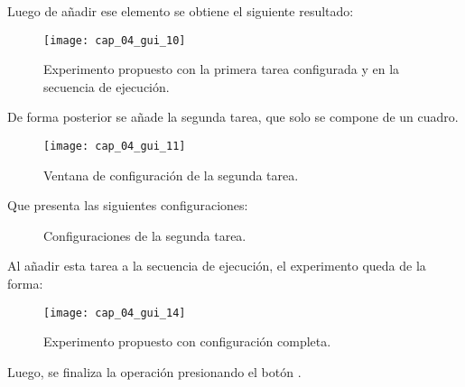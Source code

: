\documentclass[\main/main.tex]{subfiles}
\begin{document}
                \newpage
                \vspace{-6mm}
                Luego de añadir ese elemento se obtiene el siguiente resultado:
                \begin{figure}[H]
                    \centering
                    \texttt{[image: cap\_04\_gui\_10]}
                    \caption{Experimento propuesto con la primera tarea configurada y en la secuencia de ejecución.}
                    \label{fig:04_gui_exp07}
                \end{figure} 

                \vspace{-6mm}
                De forma posterior se añade la segunda tarea, que solo se compone de un cuadro.
                \begin{figure}[H]
                    \centering
                    \texttt{[image: cap\_04\_gui\_11]}
                    \caption{Ventana de configuración de la segunda tarea.}
                    \label{fig:04_gui_exp08}
                \end{figure} 

                \newpage
                \vspace{-6mm}
                Que presenta las siguientes configuraciones: 
                \begin{figure}[H]
                    \centering
                     \hspace{5mm}
                    \caption{Configuraciones de la segunda tarea.}
                    \label{fig:04_gui_exp09}
                \end{figure} 

                \vspace{-6mm} 
                Al añadir esta tarea a la secuencia de ejecución, el experimento queda de la forma: 
                \begin{figure}[H]
                    \centering
                    \texttt{[image: cap\_04\_gui\_14]}
                    \caption{Experimento propuesto con configuración completa.}
                    \label{fig:04_gui_exp10}
                \end{figure} 

                \newpage
                Luego, se finaliza la operación presionando el botón .
\end{document}
